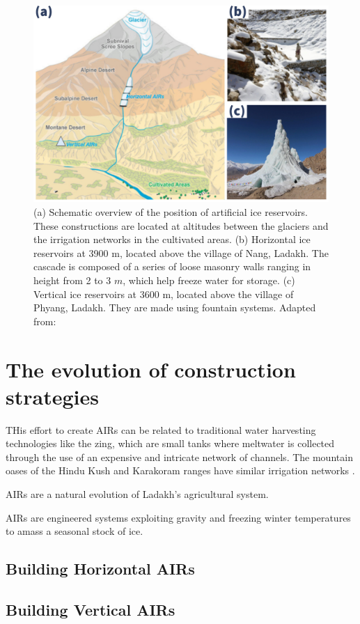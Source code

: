 \begin{figure}[t]
\includegraphics[width=12cm]{Figures/AIR_forms.jpg}

\caption{(a) Schematic overview of the position of artificial ice reservoirs. These constructions are located at
  altitudes between the glaciers and the irrigation networks in the cultivated areas. (b) Horizontal ice
  reservoirs at 3900 m, located above the village of Nang, Ladakh. The cascade is composed of a series of loose
  masonry walls ranging in height from 2 to 3 $m$, which help freeze water for storage. (c) Vertical ice
reservoirs at 3600 m, located above the village of Phyang, Ladakh. They are made using fountain systems. Adapted
from: \cite{nusserLocalKnowledgeGlobal2016}}

\label{fig:AIRforms}
\end{figure}

\section{The evolution of construction strategies}

THis effort to create AIRs can be related to traditional water harvesting technologies like the zing, which are
small tanks where meltwater is collected through the use of an expensive and intricate network of channels. The
mountain oases of the Hindu Kush and Karakoram ranges have similar irrigation networks
\citep{nusserLocalKnowledgeGlobal2016}.

AIRs are a natural evolution of Ladakh's agricultural system.

AIRs are engineered systems exploiting gravity and freezing winter temperatures to amass a seasonal stock of
ice.

\subsection{Building Horizontal AIRs}

\subsection{Building Vertical AIRs}
